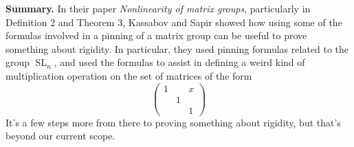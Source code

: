 \documentclass[12pt]{article}
\theoremstyle{definition}
\numberwithin{theorem}{subsection}
\newcommand{\tbf}{\textbf}
\newcommand{\noi}{\noindent}
\DeclareMathOperator{\SL}{SL}
\begin{document}
\bigskip

\noi \tbf{Summary.} In their paper \textit{Nonlinearity of matrix groups}, particularly in Definition 2 and Theorem 3, Kassabov and Sapir showed how using some of the formulas involved in a pinning of a matrix group can be useful to prove something about rigidity. In particular, they used pinning formulas related to the group $\SL_n$, and used the formulas to assist in defining a weird kind of multiplication operation on the set of matrices of the form
\[
	\begin{pmatrix}
		1 && x \\
		& 1 \\
		&& 1
	\end{pmatrix}
\]
It's a few steps more from there to proving something about rigidity, but that's beyond our current scope.
\end{document}
